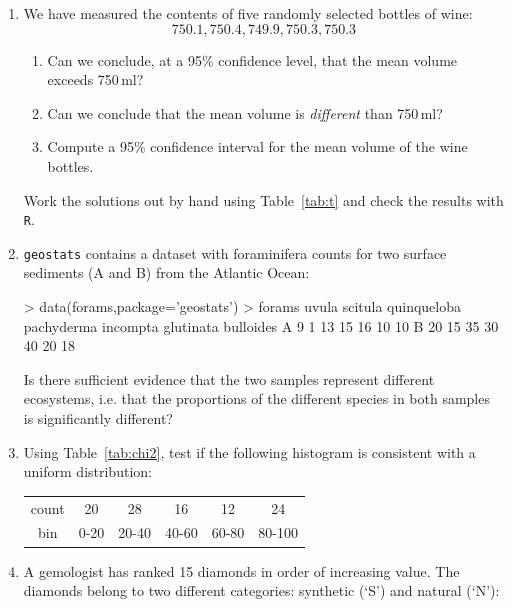 \begin{enumerate}

\item\label{it:wine-t} We have measured the contents of five randomly
  selected bottles of wine:
  \[
  750.1, 750.4, 749.9, 750.3, 750.3
  \]

  \begin{enumerate}
    \item\label{it:one-sided} Can we conclude, at a 95\% confidence
      level, that the mean volume exceeds 750\,ml?
    \item\label{it:two-sided} Can we conclude that the mean volume is
      \emph{different} than 750\,ml?
    \item Compute a 95\% confidence interval for the mean volume of
      the wine bottles.
  \end{enumerate}

  Work the solutions out by hand using Table~\ref{tab:t} and check the
  results with \texttt{R}.

\item \texttt{geostats} contains a dataset with foraminifera counts
  for two surface sediments (A and B) from the Atlantic Ocean:

\begin{console}
> data(forams,package='geostats')
> forams
  uvula scitula quinqueloba pachyderma incompta glutinata bulloides
A     9       1          13         15       16        10        10
B    20      15          35         30       40        20        18
\end{console}

Is there sufficient evidence that the two samples represent different
ecosystems, i.e. that the proportions of the different species in both
samples is significantly different?
  
\item Using Table~\ref{tab:chi2}, test if the following histogram is
  consistent with a uniform distribution:
  
    \begin{tabular}{c|ccccc}
      count & 20 & 28 & 16 & 12 & 24 \\
      bin  & 0-20 & 20-40 & 40-60 & 60-80 & 80-100
    \end{tabular}

\item A gemologist has ranked 15 diamonds in order of increasing
  value. The diamonds belong to two different categories: synthetic
  (`S') and natural (`N'):


\end{enumerate}
